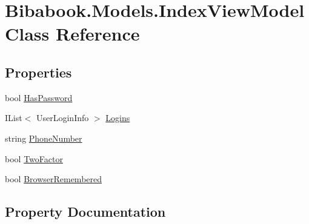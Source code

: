 \hypertarget{class_bibabook_1_1_models_1_1_index_view_model}{}\section{Bibabook.\+Models.\+Index\+View\+Model Class Reference}
\label{class_bibabook_1_1_models_1_1_index_view_model}
\subsection*{Properties}
\begin{DoxyCompactItemize}
\item 
bool \hyperlink{class_bibabook_1_1_models_1_1_index_view_model_a373515a492d2c888dddec3b4e4a76dcc}{Has\+Password}
\item 
I\+List$<$ User\+Login\+Info $>$ \hyperlink{class_bibabook_1_1_models_1_1_index_view_model_adbea1f9967c6a8b5d451fe2109a6ec40}{Logins}
\item 
string \hyperlink{class_bibabook_1_1_models_1_1_index_view_model_ad659d4c7f36cb7d9c98723a171ec337c}{Phone\+Number}
\item 
bool \hyperlink{class_bibabook_1_1_models_1_1_index_view_model_a383ac98d84ba3542cd9f94377c19c65f}{Two\+Factor}
\item 
bool \hyperlink{class_bibabook_1_1_models_1_1_index_view_model_a1d6dbedbcdadeb89856116c3035ed613}{Browser\+Remembered}
\end{DoxyCompactItemize}


\subsection{Property Documentation}
\hypertarget{class_bibabook_1_1_models_1_1_index_view_model_a1d6dbedbcdadeb89856116c3035ed613}{}
